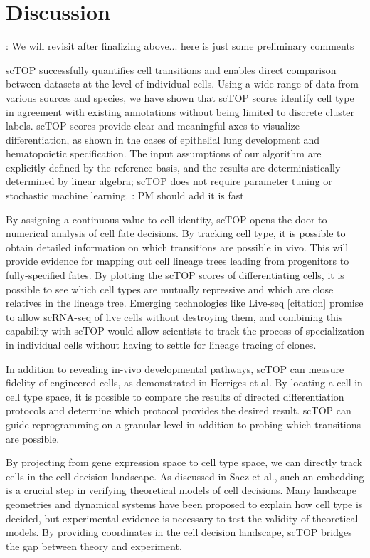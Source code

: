 \documentclass[aps,superscriptaddress, notitlepage,longbibliography]{revtex4-1}
\begin{document}
\section{Discussion}
{\color{red}: We will revisit after finalizing above... here is just some preliminary comments}

scTOP successfully quantifies cell transitions and enables direct comparison between datasets at the level of individual cells. Using a wide range of data from various sources and species, we have shown that scTOP scores identify cell type in agreement with existing annotations without being limited to discrete cluster labels. scTOP scores provide clear and meaningful axes to visualize differentiation, as shown in the cases of epithelial lung development and hematopoietic specification. The input assumptions of our algorithm are explicitly defined by the reference basis, and the results are deterministically determined by linear algebra; scTOP does not require parameter tuning or stochastic machine learning. {\color{red}: PM should add it is fast}

By assigning a continuous value to cell identity, scTOP opens the door to numerical analysis of cell fate decisions. By tracking cell type, it is possible to obtain detailed information on which transitions are possible in vivo. This will provide evidence for mapping out cell lineage trees leading from progenitors to fully-specified fates. By plotting the scTOP scores of differentiating cells, it is possible to see which cell types are mutually repressive and which are close relatives in the lineage tree. Emerging technologies like Live-seq [citation] promise to allow scRNA-seq of live cells without destroying them, and combining this capability with scTOP would allow scientists to track the process of specialization in individual cells without having to settle for lineage tracing of clones.

In addition to revealing in-vivo developmental pathways, scTOP can measure fidelity of engineered cells, as demonstrated in Herriges et al. By locating a cell in cell type space, it is possible to compare the results of directed differentiation protocols and determine which protocol provides the desired result. scTOP can guide reprogramming on a granular level in addition to probing which transitions are possible.

By projecting from gene expression space to cell type space, we can directly track cells in the cell decision landscape. As discussed in Saez et al.\cite{saez_dynamical_nodate}, such an embedding is a crucial step in verifying theoretical models of cell decisions. Many landscape geometries and dynamical systems have been proposed to explain how cell type is decided, but experimental evidence is necessary to test the validity of theoretical models. By providing coordinates in the cell decision landscape, scTOP bridges the gap between theory and experiment.
\end{document}
